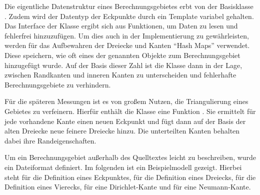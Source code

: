 \documentclass[crop=false,10pt,ngerman]{standalone}
\begin{document}
      Die eigentliche Datenstruktur  eines Berechnungsgebietes erbt von der Basisklasse .
      Zudem wird der Datentyp der Eckpunkte durch ein Template variabel gehalten.
      Das Interface der Klasse ergibt sich aus Funktionen, um Daten zu lesen und fehlerfrei hinzuzufügen.
      Um dies auch in der Implementierung zu gewährleisten, werden für das Aufbewahren der Dreiecke und Kanten \enquote{Hash Maps} verwendet.
      Diese speichern, wie oft eines der genannten Objekte zum Berechnungsgebiet hinzugefügt wurde.
      Auf der Basis dieser Zahl ist die Klasse dann in der Lage, zwischen Randkanten und inneren Kanten zu unterscheiden und fehlerhafte Berechnungsgebiete zu verhindern.

      Für die späteren Messungen ist es von großem Nutzen, die Triangulierung eines Gebietes zu verfeinern.
      Hierfür enthält die Klasse  eine Funktion .
      Sie ermittelt für jede vorhandene Kante einen neuen Eckpunkt und fügt dann auf der Basis der alten Dreiecke neue feinere Dreiecke hinzu.
      Die unterteilten Kanten behalten dabei ihre Randeigenschaften.

      Um ein Berechnungsgebiet außerhalb des Quelltextes leicht zu beschreiben, wurde ein Dateiformat definiert.
      Im folgenden ist ein Beispielmodell gezeigt.
      Hierbei steht  für die Definition eines Eckpunktes,  für die Definition eines Dreiecks,  für die Definition eines Vierecks,  für eine Dirichlet-Kante und  für eine Neumann-Kante.
      \begin{center}
        \noindent
        \begin{minipage}[b]{0.32\textwidth}
          \begin{tcolorbox}[titlerule=0.1pt,boxrule=0.5pt,arc=5pt,title={Zeile 1-13}]
            
          \end{tcolorbox}
        \end{minipage}
        \hfill
        \begin{minipage}[b]{0.32\textwidth}
          \begin{tcolorbox}[titlerule=0.1pt,boxrule=0.5pt,arc=5pt,title={Zeile 14-26}]
            
          \end{tcolorbox}
        \end{minipage}
        \hfill
        \begin{minipage}[b]{0.32\textwidth}
          \begin{tcolorbox}[titlerule=0.1pt,boxrule=0.5pt,arc=5pt,title={Zeile 27-39}]
            
          \end{tcolorbox}
        \end{minipage}
      \end{center}
\end{document}
